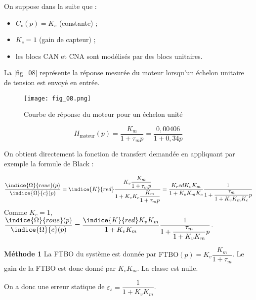 \ifprof
\else
On suppose dans la suite que :
\begin{itemize}
\item $C_v ( p)=K_v$ (constante) ;
\item $K_c =1$ (gain de capteur) ;
\item  les blocs CAN et CNA sont modélisés par des blocs unitaires.
\end{itemize}

La \autoref{fig_08} représente la réponse mesurée du moteur lorsqu’un échelon unitaire de tension est
envoyé en entrée.

\begin{figure}[H]
\centering
\texttt{[image: fig\_08.png]}
\caption{Courbe de réponse du moteur pour un échelon unité\label{fig_08}}
\end{figure}
\fi

\ifprof
\begin{corrige}
$$H_{\text{moteur}} (p)=\dfrac{K_m}{1+\tau_m p}=\dfrac{0,00406}{1+0,34p}$$ 
\end{corrige}
\else
\fi

\ifprof
\begin{corrige}
On obtient directement la fonction de transfert demandée en appliquant par exemple la formule de Black :


$$ \dfrac{\indice{\Omega}{roue}(p)}{\indice{\Omega}{c}(p)} 
= \indice{K}{red} \dfrac{K_v\dfrac{K_m}{1+\tau_m p}}{1+K_vK_c\dfrac{K_m}{1+\tau_m p}}
= \dfrac{K_red K_v K_m}{1+K_v K_m K_c }\dfrac{1}{1+\dfrac{\tau_m}{1+K_v K_m K_c} p}
$$
Comme $K_c=1$, 
$\dfrac{\indice{\Omega}{roue}(p)}{\indice{\Omega}{c} (p)}=\dfrac{\indice{K}{red} K_v K_m}{1+K_v K_m } \dfrac{1}{1+\dfrac{\tau_m}{1+K_v K_m}  p}$.

\end{corrige}
\else
\fi

%
\ifprof
\begin{corrige}
\textbf{Méthode 1}
La FTBO du système est donnée par $\text{FTBO}(p)=K_v \dfrac{K_m}{1+\tau_m}$. Le gain de la FTBO est donc donné par $K_vK_m$. La classe est nulle. 

On a donc une erreur statique de $\varepsilon_s = \dfrac{1}{1+K_vK_m}$.

\end{corrige}
\else
\fi

